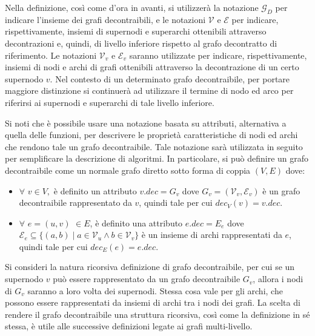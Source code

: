 Nella definizione, cos\`{i} come d'ora in avanti, si utilizzer\`a la notazione $\mathcal{G}_D$ per indicare l'insieme
dei grafi decontraibili, e le notazioni $\mathcal{V}$ e $\mathcal{E}$ per
indicare, rispettivamente, insiemi di supernodi e superarchi ottenibili attraverso decontrazioni e, quindi, di
livello inferiore rispetto al grafo decontratto di riferimento.
Le notazioni $\mathcal{V}_v$ e $\mathcal{E}_v$ saranno utilizzate per indicare, rispettivamente,
insiemi di nodi e archi di grafi ottenibili attraverso la decontrazione di un certo supernodo $v$.
Nel contesto di un determinato grafo decontraibile, per portare maggiore distinzione si continuer\`a ad utilizzare
il termine di nodo ed arco per riferirsi ai supernodi e superarchi di tale livello inferiore. \newline

Si noti che \`e possibile usare una notazione basata su attributi, alternativa a quella delle funzioni, per
descrivere le propriet\`a caratteristiche di nodi ed archi che rendono tale un grafo decontraibile.
Tale notazione sar\`a utilizzata in seguito per semplificare la descrizione di algoritmi. \newline
In particolare, si pu\`o definire un grafo decontraibile come un normale grafo diretto sotto forma di coppia
$(V, E)$ dove:
\begin{itemize}
    \item $\forall$ $v \in V,$ \`e definito un attributo $v.dec = G_v$ dove $G_v = (\mathcal{V}_v, \mathcal{E}_v)$ \`e un
        grafo decontraibile rappresentato da $v$, quindi tale per cui $dec_V(v) = v.dec$.
    \item $\forall$ $e=(u, v)$  $\in E$, \`e definito una attributo $e.dec = E_e$ dove \\
        ${\mathcal{E}_e \subseteq \{(a, b) \mid a \in \mathcal{V}_u \wedge b \in \mathcal{V}_v\}}$ \`e un insieme di archi
        rappresentati da $e$, quindi tale per cui $dec_E(e) = e.dec$.
\end{itemize}

Si consideri la natura ricorsiva definizione di grafo decontraibile, per cui se un supernodo $v$ pu\`o essere
rappresentato da un grafo decontraibile $G_v$, allora i nodi di $G_v$ saranno a loro volta dei supernodi.
Stessa cosa vale per gli archi, che possono essere rappresentati da insiemi di archi tra i nodi dei grafi.
La scelta di rendere il grafo decontraibile una struttura ricorsiva, cos\`{i} come la definizione in sé stessa,
\`e utile alle successive definizioni legate ai grafi multi-livello. \newline

